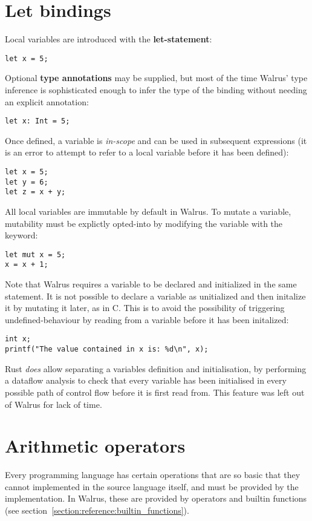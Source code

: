 \section{Let bindings}\label{section:reference:let_bindings}
Local variables are introduced with the \textbf{let-statement}:

\begin{verbatim}
let x = 5;
\end{verbatim}

Optional \textbf{type annotations} may be supplied, but most of the time
Walrus' type inference is sophisticated enough to infer the type of the binding
without needing an explicit annotation:
\begin{verbatim}
let x: Int = 5;
\end{verbatim}

Once defined, a variable is \textit{in-scope} and can be used in subsequent expressions
(it is an error to attempt to refer to a local variable before it has been defined):
\begin{verbatim}
let x = 5;
let y = 6;
let z = x + y;
\end{verbatim}

All local variables are immutable by default in Walrus. To mutate a variable, mutability
must be explictly opted-into by modifying the variable with the  keyword:
\begin{verbatim}
let mut x = 5;
x = x + 1;
\end{verbatim}


Note that Walrus requires a variable to be declared and initialized in the same statement.
It is not possible to declare a variable as unitialized and then initalize it by mutating
it later, as in C. This is to avoid the possibility of triggering undefined-behaviour by
reading from a variable before it has been initalized:
\begin{verbatim}
int x;
printf("The value contained in x is: %d\n", x);
\end{verbatim}

Rust \textit{does} allow separating a variables definition and initialisation, by performing
a dataflow analysis to check that every variable has been initialised in every possible
path of control flow before it is first read from. This feature was left out of Walrus
for lack of time.

\section{Arithmetic operators}\label{section:reference:operators}
Every programming language has certain operations that are so basic that they
cannot implemented in the source language itself, and must be provided by the implementation.
In Walrus, these are provided by operators and builtin functions
(see section~\ref{section:reference:builtin_functions}).

